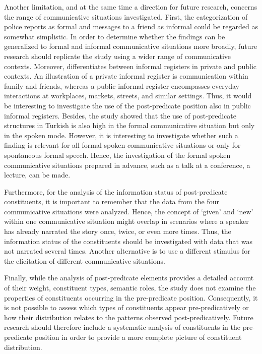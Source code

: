 Another limitation, and at the same time a direction for future research, concerns the range of communicative situations investigated. First, the categorization of police reports as formal and messages to a friend as informal could be regarded as somewhat simplistic. In order to determine whether the findings can be generalized to formal and informal communicative situations more broadly, future research should replicate the study using a wider range of communicative contexts. Moreover, \citet{Maas2010} differentiates between informal registers in private and public contexts. An illustration of a private informal register is communication within family and friends, whereas a public informal register encompasses everyday interactions at workplaces, markets, streets, and similar settings. Thus, it would be interesting to investigate the use of the post-predicate position also in public informal registers. Besides, the study showed that the use of post-predicate structures in Turkish is also high in the formal communicative situation but only in the spoken mode. However, it is interesting to investigate whether such a finding is relevant for all formal spoken communicative situations or only for spontaneous formal speech. Hence, the investigation of the formal spoken communicative situations prepared in advance, such as a talk at a conference, a lecture, can be made.

Furthermore, for the analysis of the information status of post-predicate constituents, it is important to remember that the data from the four communicative situations were analyzed. Hence, the concept of ‘given’ and ‘new’ within one communicative situation might overlap in scenarios where a speaker has already narrated the story once, twice, or even more times. Thus, the information status of the constituents should be investigated with data that was not narrated several times. Another alternative is to use a different stimulus for the elicitation of different communicative situations.

Finally, while the analysis of post-predicate elements provides a detailed account of their weight, constituent types, semantic roles, the study does not examine the properties of constituents occurring in the pre-predicate position. Consequently, it is not possible to assess which types of constituents appear pre-predicatively or how their distribution relates to the patterns observed post-predicatively. Future research should therefore include a systematic analysis of constituents in the pre-predicate position in order to provide a more complete picture of constituent distribution.

